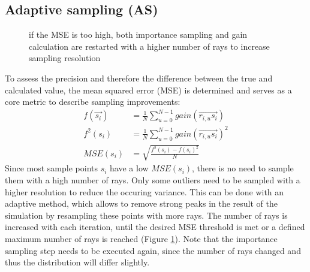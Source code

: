 \subsection{Adaptive sampling (AS)}
\label{subsec:adaptive_sampling}
\begin{figure}[H]
  \centerline
  {}
  \caption{if the MSE is too high, both importance sampling and gain calculation
  are restarted with a higher number of rays to increase sampling resolution}
  \label{graphic:pap3}
\end{figure}
To assess the precision
and therefore the difference between the true and calculated value,
the mean squared error (MSE) is determined and serves as a core metric to
describe sampling improvements:
\begin{align}
     f(\vec{s_i}) &= \frac{1}{N} \sum_{u=0}^{N-1} gain(\overrightarrow{r_{i,u}s_i})\\
     f^2(s_i)     &= \frac{1}{N} \sum_{u=0}^{N-1} gain(\overrightarrow{r_{i,u}s_i})^2\\
     MSE(s_i)     &= \sqrt{\frac{f^2(s_i) - f(s_i)^2}{N}}
\end{align}
Since most sample points $s_i$ have a low $MSE(s_i)$, there is no need
to sample them with a high number of rays. Only some outliers need to
be sampled with a higher resolution to reduce the occuring variance. This can be done with an adaptive
method, which allows to remove strong peaks in the result
of the simulation by resampling these points with more rays. The number of rays
is increased with each iteration, until the desired MSE threshold is met or 
a defined maximum number of rays is reached (Figure \ref{graphic:pap3}).
Note that the importance sampling step needs to be executed again, since
the number of rays changed and thus the distribution will differ slightly.

